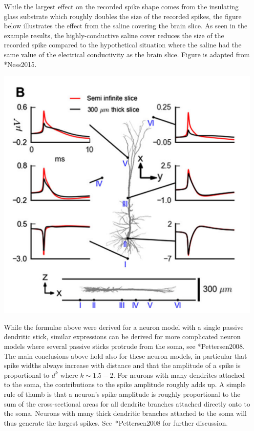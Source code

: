 While the largest effect on the recorded spike shape comes from the insulating 
glass substrate which roughly doubles the size of the recorded spikes, the figure below illustrates the 
effect from the saline covering the brain slice. As seen in the example results, the highly-conductive 
saline cover reduces the size of the recorded spike compared to the hypothetical 
situation where the saline had the same value of the electrical conductivity as the brain slice.
Figure is adapted from \citeasnoun**{Ness2015}.
%
\begin{center}
\includegraphics{Figures/Spikes/Spikes-MEA-2-w43-r300}
\end{center}
%


While the formulae above were derived for a neuron model with a single passive dendritic stick, similar expressions can be derived for 
more complicated neuron models where several passive sticks protrude from the soma, see \citeasnoun**{Pettersen2008}.
The main conclusions above hold also for these neuron models, in particular that spike widths always increase with distance and that
the amplitude of a spike is proportional to $d^{k}$ where $k\sim1.5-2$. For neurons with many dendrites attached to the 
soma, the contributions to the spike amplitude roughly adds up. A simple rule of thumb is that a neuron's spike amplitude is 
roughly proportional to the sum of the cross-sectional areas for all dendrite branches attached directly onto to the soma. Neurons with many thick
dendritic branches attached to the soma will thus generate the largest spikes. See~\citeasnoun**{Pettersen2008} for further discussion.


